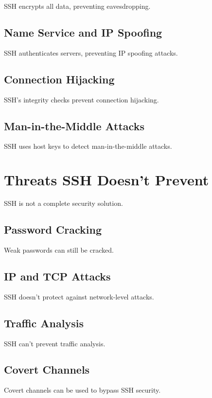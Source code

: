 \documentclass[12pt]{book}
\begin{document}
SSH encrypts all data, preventing eavesdropping.

\subsection{Name Service and IP Spoofing}

SSH authenticates servers, preventing IP spoofing attacks.

\subsection{Connection Hijacking}

SSH's integrity checks prevent connection hijacking.

\subsection{Man-in-the-Middle Attacks}

SSH uses host keys to detect man-in-the-middle attacks.

\section{Threats SSH Doesn't Prevent}

SSH is not a complete security solution.

\subsection{Password Cracking}

Weak passwords can still be cracked.

\subsection{IP and TCP Attacks}

SSH doesn't protect against network-level attacks.

\subsection{Traffic Analysis}

SSH can't prevent traffic analysis.

\subsection{Covert Channels}

Covert channels can be used to bypass SSH security.
\end{document}
